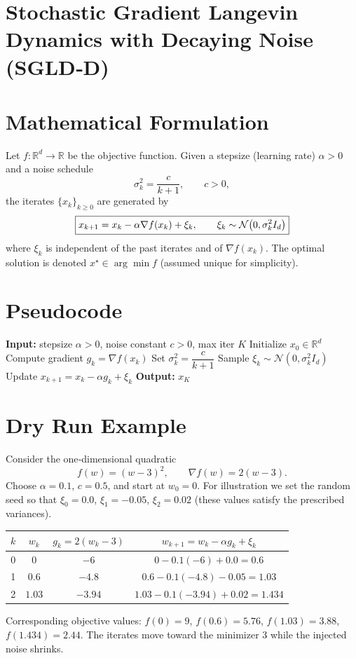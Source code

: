 \documentclass{article}
\begin{document}
\section*{Stochastic Gradient Langevin Dynamics with Decaying Noise (SGLD‑D)}

\section*{Mathematical Formulation}
Let $f:\mathbb{R}^d\to\mathbb{R}$ be the objective function.  
Given a stepsize (learning rate) $\alpha>0$ and a noise schedule
\[
\sigma_k^2 = \frac{c}{k+1},\qquad c>0,
\]
the iterates $\{x_k\}_{k\ge 0}$ are generated by
\begin{equation}
\boxed{%
x_{k+1}=x_k-\alpha \nabla f(x_k)+\xi_k, \qquad 
\xi_k\sim\mathcal{N}\bigl(0,\sigma_k^2 I_d\bigr) } 
\label{eq:update}
\end{equation}
where $\xi_k$ is independent of the past iterates and of $\nabla f(x_k)$.  
The optimal solution is denoted $x^\star\in\arg\min f$ (assumed unique for simplicity).

\section*{Pseudocode}
\begin{algorithm}[H]
\caption{SGLD‑D}
\begin{algorithmic}[1]
\State \textbf{Input:} stepsize $\alpha>0$, noise constant $c>0$, max iter $K$
\State Initialize $x_0\in\mathbb{R}^d$
    \State Compute gradient $g_k=\nabla f(x_k)$
    \State Set $\sigma_k^2 = \dfrac{c}{k+1}$
    \State Sample $\xi_k\sim\mathcal{N}(0,\sigma_k^2 I_d)$
    \State Update $x_{k+1}=x_k-\alpha g_k+\xi_k$
\EndFor
\State \textbf{Output:} $x_K$
\end{algorithmic}
\end{algorithm}

\section*{Dry Run Example}
Consider the one‑dimensional quadratic 
\[
f(w)=(w-3)^2, \qquad \nabla f(w)=2(w-3).
\]
Choose $\alpha=0.1$, $c=0.5$, and start at $w_0=0$.  
For illustration we set the random seed so that $\xi_0=0.0$, $\xi_1=-0.05$, $\xi_2=0.02$ (these values satisfy the prescribed variances).

\begin{center}
\begin{tabular}{c|c|c|c}
$k$ & $w_k$ & $g_k=2(w_k-3)$ & $w_{k+1}=w_k-\alpha g_k+\xi_k$ \\ \hline
0 & $0$ & $-6$ & $0-0.1(-6)+0.0=0.6$ \\
1 & $0.6$ & $-4.8$ & $0.6-0.1(-4.8)-0.05=1.03$ \\
2 & $1.03$ & $-3.94$ & $1.03-0.1(-3.94)+0.02=1.434$ \\
\end{tabular}
\end{center}
Corresponding objective values: $f(0)=9$, $f(0.6)=5.76$, $f(1.03)=3.88$, $f(1.434)=2.44$.  
The iterates move toward the minimizer $3$ while the injected noise shrinks.
\end{document}

